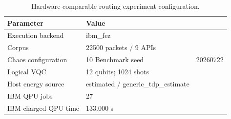 \begin{table}[htbp]
\caption{Hardware-comparable routing experiment configuration.}
\label{tab:routing-experiment-configuration}
\centering
\begin{tabular}{ll}
\hline
Parameter & Value \\
\hline
Execution backend & ibm\_fez \\
Corpus & 22500 packets / 9 APIs \\
Chaos configuration & 10%
Benchmark seed & 20260722 \\
Logical VQC & 12 qubits; 1024 shots \\
Host energy source & estimated / generic\_tdp\_estimate \\
IBM QPU jobs & 27 \\
IBM charged QPU time & 133.000 s \\
\hline
\end{tabular}
\end{table}
